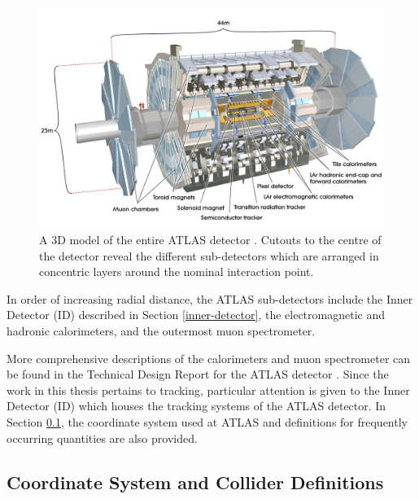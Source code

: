\begin{figure}[htb!]
\includegraphics[width=\textwidth]{images/2-LHC-ATLAS/atlas_detector.jpg}
\caption{A 3D model of the entire ATLAS detector \cite{Jon-And:1237407}. Cutouts to the centre of the detector reveal the different sub-detectors which are arranged in concentric layers around the nominal interaction point.}
\label{fig: atlas-detector}
\end{figure}

In order of increasing radial distance, the ATLAS sub-detectors include the Inner Detector (ID) described in Section \ref{inner-detector}, the electromagnetic and hadronic calorimeters, and the outermost muon spectrometer. 

More comprehensive descriptions of the calorimeters and muon spectrometer can be found in the Technical Design Report for the ATLAS detector \cite{inner-detector-TDR}. Since the work in this thesis pertains to tracking, particular attention is given to the Inner Detector (ID) which houses the tracking systems of the ATLAS detector. In Section \ref{coordinate-system}, the coordinate system used at ATLAS and definitions for frequently occurring quantities are also provided.



\subsection{Coordinate System and Collider Definitions}
\label{coordinate-system}


